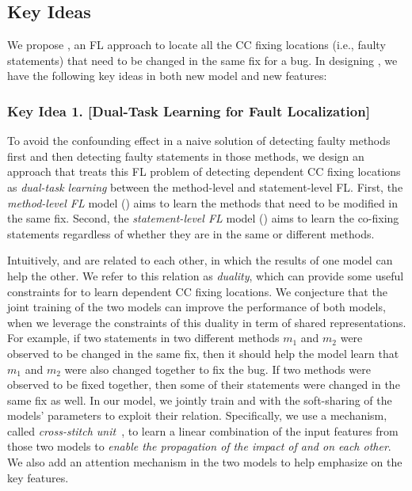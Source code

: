 \subsection{Key Ideas}
\label{sec:key-ideas}


We propose {\tool}, an FL approach to locate all the CC fixing
locations (i.e., faulty statements) that need to be changed in the
same fix for a bug. In designing {\tool}, we have the following key
ideas in both new model and new features:


\subsubsection{{\bf Key Idea 1. [Dual-Task Learning for Fault Localization]}}
To avoid the confounding effect in a naive solution of detecting
faulty methods first and then detecting faulty statements in those
methods, we design an approach that treats this FL problem of
detecting dependent CC fixing locations as {\em dual-task learning}
between the method-level and statement-level FL. First, the {\em
  method-level FL} model () aims to learn the methods
that need to be modified in the same fix. Second, the {\em
  statement-level FL} model () aims to learn the
co-fixing statements regardless of whether they are in the same or
different methods.

Intuitively,  and  are related to each
other, in which the results of one model can help the other. We refer
to this relation as {\em duality}, which can provide some useful
constraints for {\tool} to learn dependent CC fixing locations.  We
conjecture that the joint training of the two models can improve the
performance of both models, when we leverage the constraints of this
duality in term of shared representations. For example, if two
statements in two different methods $m_1$ and $m_2$ were observed to
be changed in the same fix, then it should help the model learn that
$m_1$ and $m_2$ were also changed together to fix the bug.  If two
methods were observed to be fixed together, then some of their
statements were changed in the same fix as well. In our model, we
jointly train  and  with the soft-sharing of
the models' parameters to exploit their relation. Specifically, we use
a mechanism, called {\em cross-stitch unit}~\cite{misra2016cross}, to
learn a linear combination of the input features from those two models to
{\em enable the propagation of the impact of  and
   on each other}.
We also add an attention mechanism in the two models to help emphasize
on the key features.


